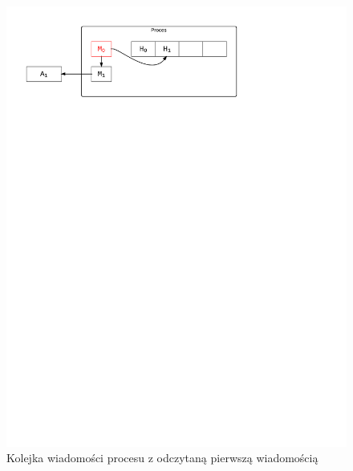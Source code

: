 \begin{figure}[h]
\centerline{\includegraphics[scale=0.75, clip, trim=10mm 220mm 68mm 10mm]{mp3}}
\caption{Kolejka wiadomości procesu z odczytaną pierwszą wiadomością}
\label{fig:mp3}
\end{figure}

